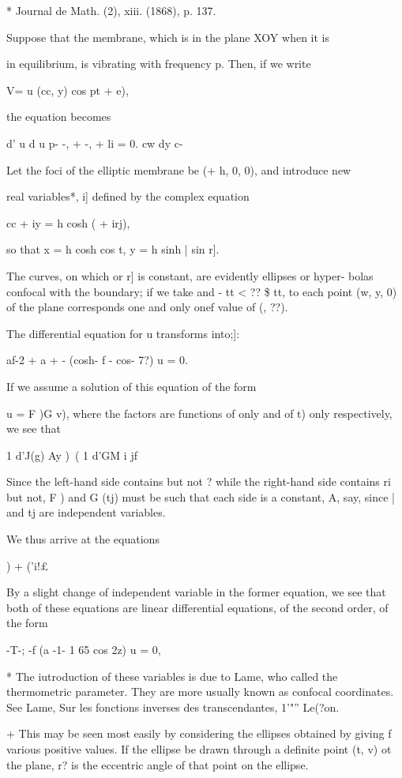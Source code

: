 * Journal de Math. (2), xiii. (1868), p. 137.

%
%

Suppose that the membrane, which is in the plane XOY when it is

in equilibrium, is vibrating with frequency p. Then, if we write

V= u (cc, y) cos pt + e),

the equation becomes

d' u d u p- -, + -, + li = 0. cw dy c-

Let the foci of the elliptic membrane be (+ h, 0, 0), and introduce
new

real variables*, i] defined by the complex equation

cc + iy = h cosh ( + irj),

so that x = h cosh cos t, y = h sinh | sin r].

The curves, on which or r] is constant, are evidently ellipses or
hyper- bolas confocal with the boundary; if we take and - tt < ?? \$
tt, to each point (w, y, 0) of the plane corresponds one and only onef
value of (, ??).

The differential equation for u transforms into;]:

af-2 + a + - (cosh- f - cos- 7?) u = 0.

If we assume a solution of this equation of the form

u = F )G v), where the factors are functions of only and of t) only
respectively, we see that

1 d'J(g) Ay )\ ( 1 d'GM i jf

Since the left-hand side contains but not ? while the right-hand side
contains ri but not, F ) and G (tj) must be such that each side is a
constant, A, say, since | and tj are independent variables.

We thus arrive at the equations

 ) + ('i!£%

By a slight change of independent variable in the former equation, we
see that both of these equations are linear differential equations, of
the second order, of the form

-T-; -f (a -1- 1 65 cos 2z) u = 0,

* The iutroduction of these variables is due to Lame, who called the
thermometric parameter. They are more usually known as confocal
coordinates. See Lame, Sur les fonctions inverses des transcendantes,
1'"'' Le(?on.

+ This may be seen most easily by considering the ellipses obtained by
giving f various positive values. If the ellipse be drawn through a
definite point (t, v) ot the plane, r? is the eccentric angle of that
point on the ellipse.

